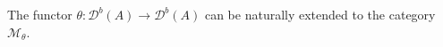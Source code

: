 \documentclass[12pt,reqno]{amsart}
\numberwithin{equation}{section}
\renewcommand{\mod}{\operatorname{mod}\nolimits}
\newcommand{\Mod}{\operatorname{Mod}\nolimits}
\newcommand{\Hom}{\operatorname{Hom}\nolimits}
\newtheorem{remark}[theorem]{Remark}
\begin{document}
	
	
	The functor $\theta\colon \mathcal{D}^b(A)\rightarrow \mathcal{D}^b(A)$ can be naturally extended to the category $\mathcal{M}_\theta$.
	
\end{document}
